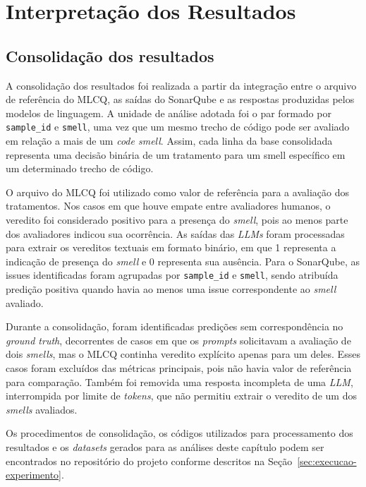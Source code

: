 \chapter[Interpretação dos Resultados]{Interpretação dos Resultados}

\section{Consolidação dos resultados}

A consolidação dos resultados foi realizada a partir da integração entre o arquivo de referência do MLCQ, as saídas do SonarQube 
e as respostas produzidas pelos modelos de linguagem. A unidade de análise adotada foi o par formado por \texttt{sample\_id} e \texttt{smell}, 
uma vez que um mesmo trecho de código pode ser avaliado em relação a mais de um \textit{code smell}. Assim, cada linha da base consolidada 
representa uma decisão binária de um tratamento para um smell específico em um determinado trecho de código.

O arquivo do MLCQ foi utilizado como valor de referência para a avaliação dos tratamentos. Nos casos em que houve empate entre 
avaliadores humanos, o veredito foi considerado positivo para a presença do \textit{smell}, pois ao menos parte dos avaliadores indicou 
sua ocorrência. As saídas das \textit{LLMs} foram processadas para extrair os vereditos textuais em formato binário, em que 1 representa 
a indicação de presença do \textit{smell} e 0 representa sua ausência. Para o SonarQube, as issues identificadas foram agrupadas por 
\texttt{sample\_id} e \texttt{smell}, sendo atribuída predição positiva quando havia ao menos uma issue correspondente ao \textit{smell} avaliado.

Durante a consolidação, foram identificadas predições sem correspondência no \textit{ground truth}, decorrentes de casos em que os \textit{prompts} 
solicitavam a avaliação de dois \textit{smells}, mas o MLCQ continha veredito explícito apenas para um deles. Esses casos foram excluídos 
das métricas principais, pois não havia valor de referência para comparação. Também foi removida uma resposta incompleta de uma \textit{LLM}, 
interrompida por limite de \textit{tokens}, que não permitiu extrair o veredito de um dos \textit{smells} avaliados.

Os procedimentos de consolidação, os códigos utilizados para processamento dos resultados e os \textit{datasets} gerados para as análises deste capítulo podem ser 
encontrados no repositório do projeto conforme descritos na Seção~\ref{sec:execucao-experimento}. 

